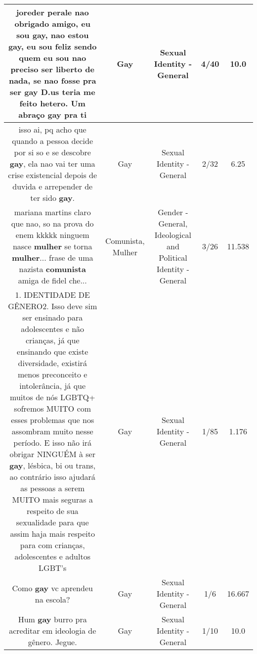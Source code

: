 \documentclass[11pt]{article}
\newlength\mylength
\begin{document}
\begin{center}
\begin{longtable}{|C{.65\mylength}|C{.30\mylength}|C{.12\mylength}|C{.12\mylength}|C{.12\mylength}|}
  \small joreder perale nao obrigado amigo, eu sou \textbf{gay}, nao estou \textbf{gay}, eu sou feliz sendo quem eu sou nao preciso ser liberto de nada, se nao fosse pra ser \textbf{gay} D.us teria me feito hetero. Um abraço \textbf{gay} pra ti\normalsize   & Gay & Sexual Identity - General & 4/40 & 10.0 \\  \hline
  \small isso ai, pq acho que quando a pessoa decide por si so e se descobre \textbf{gay}, ela nao vai ter uma crise existencial depois de duvida e arrepender de ter sido \textbf{gay}.\normalsize   & Gay & Sexual Identity - General & 2/32 & 6.25 \\  \hline
  \small mariana martins claro que nao, so na prova do enem kkkkk ninguem nasce \textbf{mulher} se torna \textbf{mulher}... frase de uma nazista \textbf{comunista} amiga de fidel che...\normalsize   & Comunista, Mulher & Gender - General, Ideological and Political Identity - General & 3/26 & 11.538 \\  \hline
  \small 1. IDENTIDADE DE GÊNERO2. Isso deve sim ser ensinado para  adolescentes e não crianças, já que ensinando que existe diversidade, existirá menos preconceito e intolerância, já que muitos de nós LGBTQ+ sofremos MUITO com esses problemas que nos assombram muito nesse período. E isso não irá obrigar NINGUÉM à ser \textbf{gay}, lésbica, bi ou trans, ao contrário isso ajudará as pessoas a serem MUITO mais seguras a respeito de sua sexualidade para que assim haja mais respeito para com crianças, adolescentes e adultos LGBT's\normalsize   & Gay & Sexual Identity - General & 1/85 & 1.176 \\  \hline
  \small Como \textbf{gay} vc aprendeu na escola?\normalsize   & Gay & Sexual Identity - General & 1/6 & 16.667 \\  \hline
  \small Hum \textbf{gay} burro pra acreditar em ideologia de gênero. Jegue.\normalsize   & Gay & Sexual Identity - General & 1/10 & 10.0 \\  \hline

\end{longtable}
\end{center}
\end{document}
